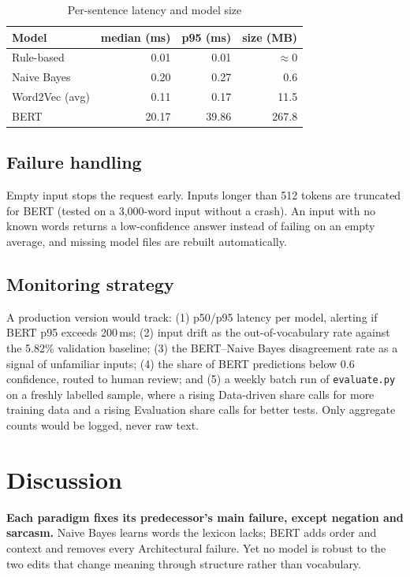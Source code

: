 \documentclass[conference]{IEEEtran}
\begin{document}
\begin{table}[t]
\centering
\caption{Per-sentence latency and model size}
\label{tab:perf}
\footnotesize
\begin{tabular}{@{}lrrr@{}}
\toprule
\textbf{Model} & \textbf{median (ms)} & \textbf{p95 (ms)} & \textbf{size (MB)} \\
\midrule
Rule-based     & 0.01  & 0.01  & $\approx$0 \\
Naive Bayes    & 0.20  & 0.27  & 0.6 \\
Word2Vec (avg) & 0.11  & 0.17  & 11.5 \\
BERT           & 20.17 & 39.86 & 267.8 \\
\bottomrule
\end{tabular}
\end{table}

\subsection{Failure handling}
Empty input stops the request early. Inputs longer than 512 tokens are truncated for BERT (tested on
a 3{,}000-word input without a crash). An input with no known words returns a low-confidence
answer instead of failing on an empty average, and missing model files are rebuilt automatically.

\subsection{Monitoring strategy}
A production version would track: (1) p50/p95 latency per model, alerting if BERT p95 exceeds
200\,ms; (2) input drift as the out-of-vocabulary rate against the 5.82\% validation baseline;
(3) the BERT--Naive Bayes disagreement rate as a signal of unfamiliar inputs; (4) the share of BERT
predictions below 0.6 confidence, routed to human review; and (5) a weekly batch run of
\texttt{evaluate.py} on a freshly labelled sample, where a rising Data-driven share calls for more
training data and a rising Evaluation share calls for better tests. Only aggregate counts would be
logged, never raw text.

\section{Discussion}\label{sec:disc}
\textbf{Each paradigm fixes its predecessor's main failure, except negation and sarcasm.} Naive Bayes
learns words the lexicon lacks; BERT adds order and context and removes every Architectural failure.
Yet no model is robust to the two edits that change meaning through structure rather than
vocabulary.
\end{document}
